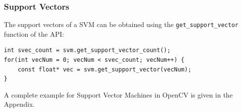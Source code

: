 \subsubsection*{Support Vectors}
The support vectors of a SVM can be obtained using the \lstinline|get_support_vector| function of the API:
\begin{lstlisting}
int svec_count = svm.get_support_vector_count();
for(int vecNum = 0; vecNum < svec_count; vecNum++) {
	const float* vec = svm.get_support_vector(vecNum);
}
\end{lstlisting}


A complete example for Support Vector Machines in OpenCV is given in the Appendix.
